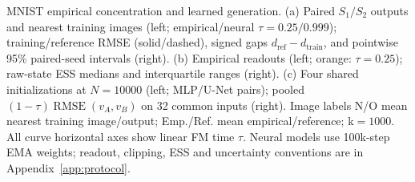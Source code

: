 \caption{MNIST empirical concentration and learned generation.
(a) Paired $S_1/S_2$ outputs and nearest training images (left;
empirical/neural $\tau=0.25/0.999$); training/reference RMSE
(solid/dashed), signed gaps $d_{\mathrm{ref}}-d_{\mathrm{train}}$, and
pointwise 95\% paired-seed intervals (right).
(b) Empirical readouts (left; orange: $\tau=0.25$); raw-state ESS
medians and interquartile ranges (right).
(c) Four shared initializations at $N=10000$ (left; MLP/U-Net pairs);
pooled $(1-\tau)\operatorname{RMSE}(v_A,v_B)$ on 32 common inputs (right).
Image labels N/O mean nearest training image/output;
Emp./Ref. mean empirical/reference; $\mathrm{k}=1000$.
All curve horizontal axes show linear FM time $\tau$.
Neural models use 100k-step EMA weights; readout, clipping, ESS and
uncertainty conventions are in Appendix~\ref{app:protocol}.}
